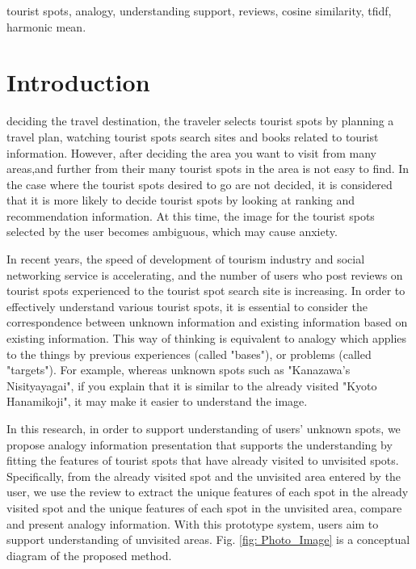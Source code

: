\documentclass[journal]{IAENGtran}
\begin{document}
\begin{IAENGkeywords}
tourist spots, analogy, understanding support, reviews, cosine similarity, tfidf, harmonic mean.
\end{IAENGkeywords}

\IAENGpeerreviewmaketitle


\section{Introduction}
\label{sec:Introduction}
 deciding the travel destination, the traveler selects tourist spots by planning a travel plan, watching tourist spots search sites and books related to tourist information. However, after deciding the area you want to visit from many areas,and further from their many tourist spots in the area is not easy to find. In the case where the tourist spots desired to go are not decided, it is considered that it is more likely to decide tourist spots by looking at ranking and recommendation information. At this time, the image for the tourist spots selected by the user becomes ambiguous, which may cause anxiety.

In recent years, the speed of development of tourism industry and social networking service is accelerating, and the number of users who post reviews on tourist spots experienced to the tourist spot search site is increasing. In order to effectively understand various tourist spots, it is essential to consider the correspondence between unknown information and existing information based on existing information. This way of thinking is equivalent to analogy which applies to the things by previous experiences (called "bases"), or problems (called "targets"). For example, whereas unknown spots such as "Kanazawa's Nisityayagai", if you explain that it is similar to the already visited "Kyoto Hanamikoji", it may make it easier to understand the image.

In this research, in order to support understanding of users' unknown spots, we propose analogy information presentation that supports the understanding by fitting the features of tourist spots that have already visited to unvisited spots. Specifically, from the already visited spot and the unvisited area entered by the user, we use the review to extract the unique features of each spot in the already visited spot and the unique features of each spot in the unvisited area, compare and present analogy information. With this prototype system, users aim to support understanding of unvisited areas. Fig. \ref{fig: Photo_Image} is a conceptual diagram of the proposed method.
\end{document}
